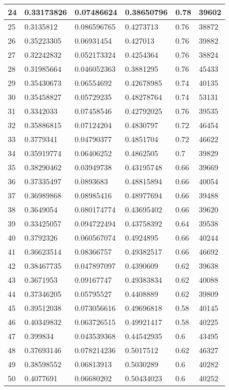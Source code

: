 \begin{longtable}{|l|l|l|l|l|l|}
24 & 0.33173826 & 0.07486624 & 0.38650796 & 0.78 & 39602 \\ \hline 
25 & 0.3135812 & 0.086596765 & 0.4273713 & 0.76 & 38872 \\ \hline 
26 & 0.35223305 & 0.06931454 & 0.427013 & 0.76 & 39882 \\ \hline 
27 & 0.32242832 & 0.052173324 & 0.4254364 & 0.76 & 38824 \\ \hline 
28 & 0.31985664 & 0.046052363 & 0.3881295 & 0.76 & 45433 \\ \hline 
29 & 0.35430673 & 0.06554692 & 0.42678985 & 0.74 & 40135 \\ \hline 
30 & 0.35458827 & 0.05729235 & 0.48278764 & 0.74 & 53131 \\ \hline 
31 & 0.3342033 & 0.07458546 & 0.42792025 & 0.76 & 39535 \\ \hline 
32 & 0.35886815 & 0.07124204 & 0.4830797 & 0.72 & 46454 \\ \hline 
33 & 0.3779341 & 0.04790377 & 0.4851704 & 0.72 & 46622 \\ \hline 
34 & 0.35919774 & 0.06406252 & 0.4862505 & 0.7 & 39829 \\ \hline 
35 & 0.38290462 & 0.03949738 & 0.43195748 & 0.66 & 39669 \\ \hline 
36 & 0.37335497 & 0.0893683 & 0.48815894 & 0.66 & 40054 \\ \hline 
37 & 0.36989868 & 0.08985416 & 0.48977694 & 0.66 & 39488 \\ \hline 
38 & 0.3649054 & 0.080174774 & 0.43695402 & 0.66 & 39620 \\ \hline 
39 & 0.33425057 & 0.094722494 & 0.43758392 & 0.64 & 39538 \\ \hline 
40 & 0.3792326 & 0.060567074 & 0.4924895 & 0.66 & 40244 \\ \hline 
41 & 0.36623514 & 0.08366757 & 0.49382517 & 0.66 & 46692 \\ \hline 
42 & 0.38467735 & 0.047897097 & 0.4390609 & 0.62 & 39638 \\ \hline 
43 & 0.3671953 & 0.09167747 & 0.49383834 & 0.62 & 40088 \\ \hline 
44 & 0.37346205 & 0.05795527 & 0.4408889 & 0.62 & 39809 \\ \hline 
45 & 0.39512038 & 0.073056616 & 0.49696818 & 0.58 & 40145 \\ \hline 
46 & 0.40349832 & 0.063726515 & 0.49921417 & 0.58 & 40225 \\ \hline 
47 & 0.399834 & 0.043539368 & 0.44542935 & 0.6 & 43495 \\ \hline 
48 & 0.37693146 & 0.078214236 & 0.5017512 & 0.62 & 46327 \\ \hline 
49 & 0.38598552 & 0.06813913 & 0.5030289 & 0.6 & 40282 \\ \hline 
50 & 0.4077691 & 0.06680202 & 0.50434023 & 0.6 & 40252 \\ \hline 
\end{longtable}
